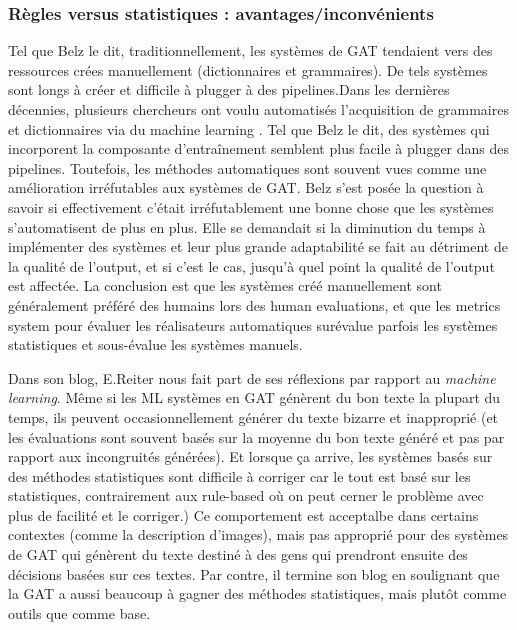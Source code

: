 \subsubsection{Règles versus statistiques : avantages/inconvénients}

Tel que Belz le dit, traditionnellement, les systèmes de \ac{GAT} tendaient vers des ressources crées manuellement (dictionnaires et grammaires). De tels systèmes sont longs à créer et difficile à plugger à des pipelines.Dans les dernières décennies, plusieurs chercheurs ont voulu automatisés l'acquisition de grammaires et dictionnaires via du machine learning \citep{LangkildeForestbasedStatisticalSentence2000}. Tel que Belz le dit, des systèmes qui incorporent la composante d'entraînement semblent plus facile à plugger dans des pipelines. Toutefois, les méthodes automatiques sont souvent vues comme une amélioration irréfutables aux systèmes de \ac{GAT}. Belz s'est posée la question à savoir si effectivement c'était irréfutablement une bonne chose que les systèmes s'automatisent de plus en plus\citep{BelzSystemBuildingCost2009}. Elle se demandait si la diminution du temps à implémenter des systèmes et leur plus grande adaptabilité se fait au détriment de la qualité de l'output, et si c'est le cas, jusqu'à quel point la qualité de l'output est affectée. La conclusion est que les systèmes créé manuellement sont généralement préféré des humains lors des human evaluations, et que les metrics system pour évaluer les réalisateurs automatiques surévalue parfois les systèmes statistiques et sous-évalue les systèmes manuels\citep{BelzSystemBuildingCost2009}.

Dans son blog, E.Reiter \citep{ReiterNaturalLanguageGeneration2016}  nous fait part de ses réflexions par rapport au \emph{machine learning}. Même si les ML systèmes en \ac{GAT} génèrent du bon texte la plupart du temps, ils peuvent occasionnellement générer du texte bizarre et inapproprié (et les évaluations sont souvent basés sur la moyenne du bon texte généré et pas par rapport aux incongruités générées). Et lorsque ça arrive, les systèmes basés sur des méthodes statistiques sont difficile à corriger car le tout est basé sur les statistiques, contrairement aux rule-based où on peut cerner le problème avec plus de facilité et le corriger.) Ce comportement est acceptalbe dans certains contextes (comme la description d'images), mais pas approprié pour des systèmes de \ac{GAT} qui génèrent du texte destiné à des gens qui prendront ensuite des décisions basées sur ces textes. Par contre, il termine son blog en soulignant que la \ac{GAT} a aussi beaucoup à gagner des méthodes statistiques, mais plutôt comme outils que comme base.

